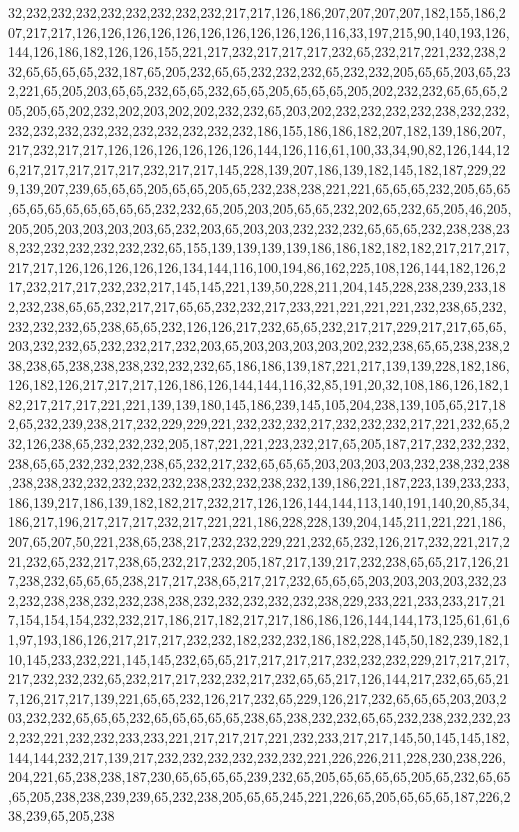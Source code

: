 32,232,232,232,232,232,232,232,232,217,217,126,186,207,207,207,207,182,155,186,207,217,217,126,126,126,126,126,126,126,126,126,126,116,33,197,215,90,140,193,126,144,126,186,182,126,126,155,221,217,232,217,217,217,232,65,232,217,221,232,238,232,65,65,65,65,232,187,65,205,232,65,65,232,232,232,65,232,232,205,65,65,203,65,232,221,65,205,203,65,65,232,65,65,232,65,65,205,65,65,65,205,202,232,232,65,65,65,205,205,65,202,232,202,203,202,202,232,232,65,203,202,232,232,232,232,238,232,232,232,232,232,232,232,232,232,232,232,232,186,155,186,186,182,207,182,139,186,207,217,232,217,217,126,126,126,126,126,126,144,126,116,61,100,33,34,90,82,126,144,126,217,217,217,217,217,232,217,217,145,228,139,207,186,139,182,145,182,187,229,229,139,207,239,65,65,65,205,65,65,205,65,232,238,238,221,221,65,65,65,232,205,65,65,65,65,65,65,65,65,65,65,232,232,65,205,203,205,65,65,232,202,65,232,65,205,46,205,205,205,203,203,203,203,65,232,203,65,203,203,232,232,232,65,65,65,232,238,238,238,232,232,232,232,232,232,65,155,139,139,139,139,186,186,182,182,182,217,217,217,217,217,126,126,126,126,126,134,144,116,100,194,86,162,225,108,126,144,182,126,217,232,217,217,232,232,217,145,145,221,139,50,228,211,204,145,228,238,239,233,182,232,238,65,65,232,217,217,65,65,232,232,217,233,221,221,221,221,232,238,65,232,232,232,232,65,238,65,65,232,126,126,217,232,65,65,232,217,217,229,217,217,65,65,203,232,232,65,232,232,217,232,203,65,203,203,203,203,202,232,238,65,65,238,238,238,238,65,238,238,238,232,232,232,65,186,186,139,187,221,217,139,139,228,182,186,126,182,126,217,217,217,126,186,126,144,144,116,32,85,191,20,32,108,186,126,182,182,217,217,217,221,221,139,139,180,145,186,239,145,105,204,238,139,105,65,217,182,65,232,239,238,217,232,229,229,221,232,232,232,217,232,232,232,217,221,232,65,232,126,238,65,232,232,232,205,187,221,221,223,232,217,65,205,187,217,232,232,232,238,65,65,232,232,232,238,65,232,217,232,65,65,65,203,203,203,203,232,238,232,238,238,238,232,232,232,232,232,238,232,232,238,232,139,186,221,187,223,139,233,233,186,139,217,186,139,182,182,217,232,217,126,126,144,144,113,140,191,140,20,85,34,186,217,196,217,217,217,232,217,221,221,186,228,228,139,204,145,211,221,221,186,207,65,207,50,221,238,65,238,217,232,232,229,221,232,65,232,126,217,232,221,217,221,232,65,232,217,238,65,232,217,232,205,187,217,139,217,232,238,65,65,217,126,217,238,232,65,65,65,238,217,217,238,65,217,217,232,65,65,65,203,203,203,203,232,232,232,238,238,232,232,238,238,232,232,232,232,232,238,229,233,221,233,233,217,217,154,154,154,232,232,217,186,217,182,217,217,186,186,126,144,144,173,125,61,61,61,97,193,186,126,217,217,217,232,232,182,232,232,186,182,228,145,50,182,239,182,110,145,233,232,221,145,145,232,65,65,217,217,217,217,232,232,232,229,217,217,217,217,232,232,232,65,232,217,217,232,232,217,232,65,65,217,126,144,217,232,65,65,217,126,217,217,139,221,65,65,232,126,217,232,65,229,126,217,232,65,65,65,203,203,203,232,232,65,65,65,232,65,65,65,65,65,238,65,238,232,232,65,65,232,238,232,232,232,232,221,232,232,233,233,221,217,217,217,221,232,233,217,217,145,50,145,145,182,144,144,232,217,139,217,232,232,232,232,232,232,221,226,226,211,228,230,238,226,204,221,65,238,238,187,230,65,65,65,65,239,232,65,205,65,65,65,65,205,65,232,65,65,65,205,238,238,239,239,65,232,238,205,65,65,245,221,226,65,205,65,65,65,187,226,238,239,65,205,238